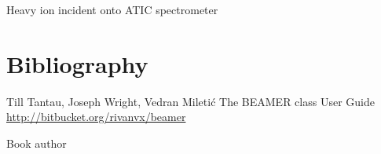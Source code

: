 \documentclass[aspectratio=169]{beamer}
\begin{document}
\begin{frame}{\secname}
{\begin{block}{Heavy ion incident onto ATIC spectrometer}
       \hfill{}
     \end{block}
   }
 \end{frame}

 \section{Bibliography}
 \begin{frame}{\secname}
   \begin{thebibliography}{3}
     \beamertemplatearticlebibitems
     Till Tantau, Joseph Wright, Vedran Mileti\'c
     \newblock The BEAMER class User Guide
     \newblock \href{http://bitbucket.org/rivanvx/beamer}{http://bitbucket.org/rivanvx/beamer}

     \beamertemplatebookbibitems
     Book author
   \end{thebibliography}
 \end{frame}

 \finalpage
\end{document}
